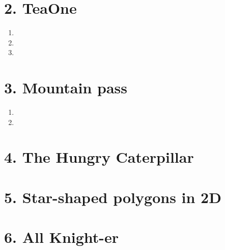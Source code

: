 \documentclass[11pt]{article}
\begin{document}
\newpage
\section*{2. TeaOne}
\begin{enumerate}[label=(\alph*)]
\item




\item




\item




\end{enumerate}



\newpage
\section*{3. Mountain pass}
\begin{enumerate}[label=(\alph*)]
\item




\item






\end{enumerate}



\newpage
\section*{4. The Hungry Caterpillar}




\newpage
\section*{5. Star-shaped polygons in 2D}




\newpage
\section*{6. All Knight-er}
\end{document}
